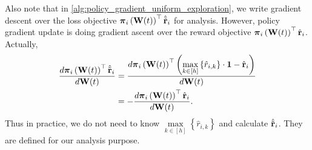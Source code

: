 Also note that in \cref{alg:policy_gradient_uniform_exploration}, we write gradient descent over the loss objective  ${\boldsymbol{\pi}}_{i}\left({\mathbf{W}}(t)\right)^\top \hat{{\tilde{\mathbf{r}}}}_i$ for analysis. However, policy gradient update is doing gradient ascent over the reward objective ${\boldsymbol{\pi}}_{i}\left({\mathbf{W}}(t)\right)^\top {\hat{\mathbf{r}}}_i$. Actually,
\begin{equation*}
\begin{split}
    \frac{d{\boldsymbol{\pi}}_{i}\left({\mathbf{W}}(t)\right)^\top \hat{{\tilde{\mathbf{r}}}}_i}{d {\mathbf{W}}(t)} &= \frac{d{\boldsymbol{\pi}}_{i}\left({\mathbf{W}}(t)\right)^\top \left( \max\limits_{k \in [h]}{\left\{ \hat{r}_{i, k} \right\}} \cdot {\mathbf{1}} - {\hat{\mathbf{r}}}_i \right)}{d {\mathbf{W}}(t)} \\
    &= - \frac{d{\boldsymbol{\pi}}_{i}\left({\mathbf{W}}(t)\right)^\top {\hat{\mathbf{r}}}_i}{d {\mathbf{W}}(t)}.
\end{split}
\end{equation*}
Thus in practice, we do not need to know $\max\limits_{k \in [h]}{\left\{ \hat{r}_{i, k} \right\}}$ and calculate $\hat{{\tilde{\mathbf{r}}}}_i$. They are defined for our analysis purpose.